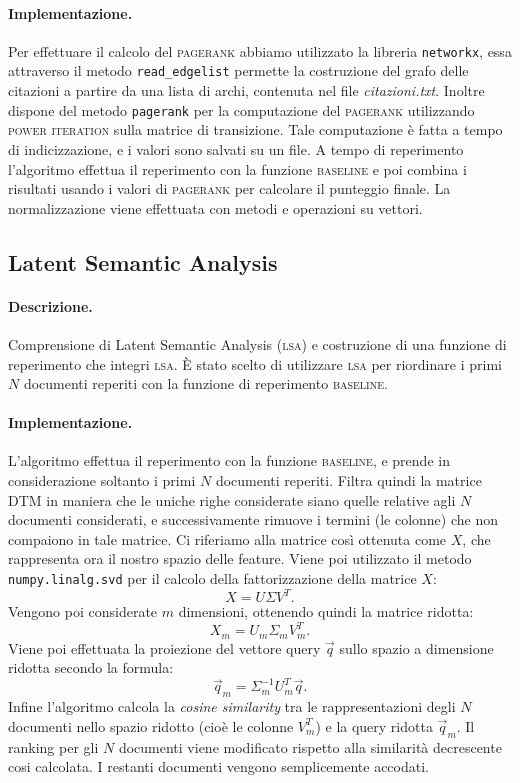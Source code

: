 \paragraph{\textbf{Implementazione.}}
Per effettuare il calcolo del \textsc{pagerank} abbiamo utilizzato la libreria \texttt{networkx}, essa attraverso il metodo \texttt{read\_edgelist} permette la costruzione del grafo delle citazioni a partire da una lista di archi, contenuta nel file \textit{citazioni.txt}. Inoltre dispone del metodo \texttt{pagerank} per la computazione del \textsc{pagerank} utilizzando \textsc{power iteration} sulla matrice di transizione. Tale computazione \`e fatta a tempo di indicizzazione, e i valori sono salvati su un file. A tempo di reperimento l'algoritmo effettua il reperimento con la funzione \textsc{baseline} e poi combina i risultati usando i valori di \textsc{pagerank} per calcolare il punteggio finale. La normalizzazione viene effettuata con metodi e operazioni su vettori.

\subsection{Latent Semantic Analysis}
\label{sec:lsa}

\paragraph{\textbf{Descrizione.}}
Comprensione di Latent Semantic Analysis (\textsc{lsa}) e costruzione di una funzione di reperimento che integri \textsc{lsa}. \`E stato scelto di utilizzare \textsc{lsa} per riordinare i primi $N$ documenti reperiti con la funzione di reperimento \textsc{baseline}. 

\paragraph{\textbf{Implementazione.}} 
L'algoritmo effettua il reperimento con la funzione \textsc{baseline}, e prende in considerazione soltanto i primi $N$ documenti reperiti. Filtra quindi la matrice DTM in maniera che le uniche righe considerate siano quelle relative agli $N$ documenti considerati, e successivamente rimuove i termini (le colonne) che non compaiono in tale matrice. Ci riferiamo alla matrice cos\`i ottenuta come $X$, che rappresenta ora il nostro spazio delle feature. Viene poi utilizzato il metodo \texttt{numpy.linalg.svd} per il calcolo della fattorizzazione della matrice $X$: 
\[ X = U \Sigma V^{T}. \]
Vengono poi considerate $m$ dimensioni, ottenendo quindi la matrice ridotta: 
\[ X_m = U_m \Sigma_m V^{T}_m. \]
Viene poi effettuata la proiezione del vettore query $\vec{q}$ sullo spazio a dimensione ridotta secondo la formula: 
\[ \vec{q}_m = \Sigma^{-1}_m U^{T}_m \vec{q}. \]
Infine l'algoritmo calcola la \textit{cosine similarity} tra le rappresentazioni degli $N$ documenti nello spazio ridotto (cio\`e le colonne $V^{T}_m$) e la query ridotta $\vec{q}_m$. Il ranking per gli $N$ documenti viene modificato rispetto alla similarit\`a  decrescente cosi calcolata. I restanti documenti vengono semplicemente accodati.

